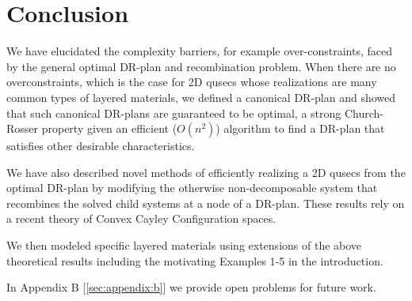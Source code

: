 \section{Conclusion}
\label{sec:conclusion}
% 

We have elucidated the complexity barriers, for example over-constraints, faced by the general optimal DR-plan and recombination problem. When there are no overconstraints, which is the case for 2D qusecs whose realizations are many common types of layered materials, we defined a canonical DR-plan and showed that such canonical DR-plans are guaranteed to be optimal, a strong Church-Rosser property given an efficient ($O(n^2)$) algorithm to find a DR-plan that satisfies other desirable characteristics.

We have also described novel methods of efficiently realizing a 2D qusecs from the optimal DR-plan by modifying the otherwise non-decomposable system that recombines the solved child systems at a node of a DR-plan. These results rely on a recent theory of Convex Cayley Configuration spaces.

We then modeled specific layered materials using extensions of the above theoretical results including the motivating Examples 1-5 in the introduction.

In Appendix B [\ref{sec:appendix:b}] we provide open problems for future work.
